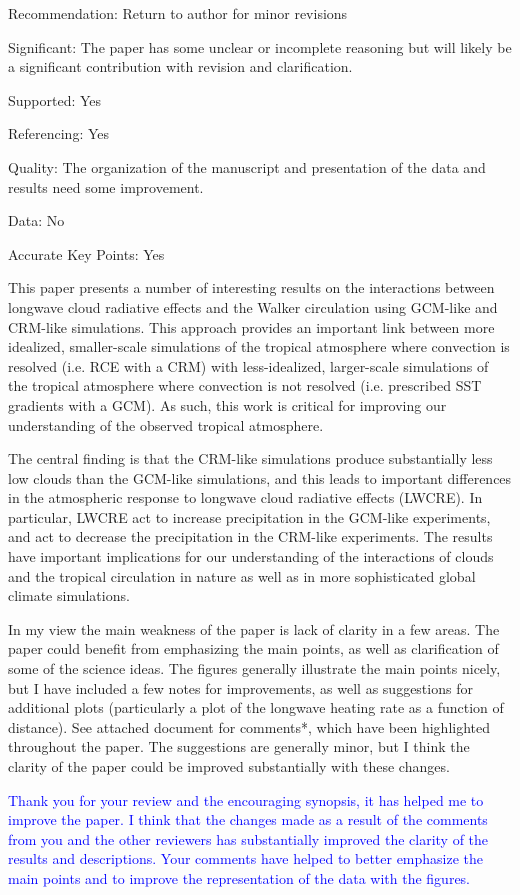\documentclass[draft]{agujournal2019}
\begin{document}
Recommendation: Return to author for minor revisions

Significant: The paper has some unclear or incomplete reasoning but will likely be a significant contribution with revision and 
clarification.

Supported: Yes

Referencing: Yes

Quality: The organization of the manuscript and presentation of the data and results need some improvement.

Data: No

Accurate Key Points: Yes

This paper presents a number of interesting results on the interactions between longwave cloud
radiative effects and the Walker circulation using GCM-like and CRM-like simulations. This
approach provides an important link between more idealized, smaller-scale simulations of the
tropical atmosphere where convection is resolved (i.e. RCE with a CRM) with less-idealized,
larger-scale simulations of the tropical atmosphere where convection is not resolved (i.e.
prescribed SST gradients with a GCM). As such, this work is critical for improving our
understanding of the observed tropical atmosphere.

The central finding is that the CRM-like simulations produce substantially less low clouds than
the GCM-like simulations, and this leads to important differences in the atmospheric response to
longwave cloud radiative effects (LWCRE). In particular, LWCRE act to increase precipitation
in the GCM-like experiments, and act to decrease the precipitation in the CRM-like experiments.
The results have important implications for our understanding of the interactions of clouds and
the tropical circulation in nature as well as in more sophisticated global climate simulations.

In my view the main weakness of the paper is lack of clarity in a few areas. The paper could
benefit from emphasizing the main points, as well as clarification of some of the science ideas.
The figures generally illustrate the main points nicely, but I have included a few notes for
improvements, as well as suggestions for additional plots (particularly a plot of the longwave
heating rate as a function of distance). See attached document for comments*, which have been
highlighted throughout the paper. The suggestions are generally minor, but I think the clarity of
the paper could be improved substantially with these changes.

\textcolor{blue}{Thank you for your review and the encouraging synopsis, it has helped me to improve the paper.  I think that 
the changes made as a result of the comments from you and the other reviewers has substantially improved the clarity of the 
results and descriptions.  Your comments have helped to better emphasize the main points and to improve the representation
of the data with the figures.}
\end{document}
